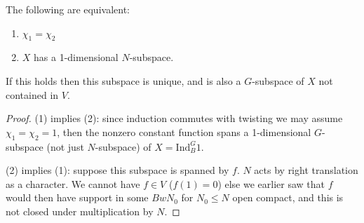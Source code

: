 \begin{prop}
    The following are equivalent:
    \begin{enumerate}
        \item $\chi_1=\chi_2$
        \item $X$ has a 1-dimensional $N$-subspace.
    \end{enumerate}
    If this holds then this subspace is unique, and is also a $G$-subspace of $X$ not contained in $V$.
\end{prop}
\begin{proof}
    (1) implies (2): since induction commutes with twisting we may assume $\chi_1=\chi_2=1$, then the nonzero constant function spans a 1-dimensional $G$-subspace (not just $N$-subspace) of $X = \mathrm{Ind}_B^G 1$.

    (2) implies (1): suppose this subspace is spanned by $f$. $N$ acts by right translation as a character. We cannot have $f \in V$ ($f(1)=0$) else we earlier saw that $f$ would then have support in some $BwN_0$ for $N_0 \leq N$ open compact, and this is not closed under multiplication by $N$.


\end{proof}

